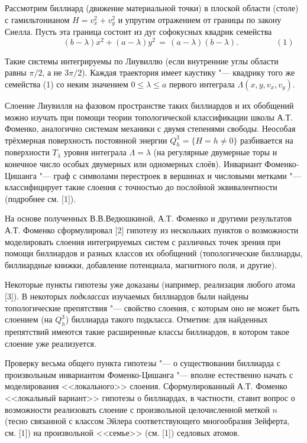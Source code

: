 \vzmscaption

Рассмотрим биллиард (движение материальной точки) в плоской области (столе) с гамильтонианом $H = v_x^2 + v_y^2$ и упругим отражением от границы по закону Снелла. Пусть эта граница состоит из дуг софокусных квадрик семейства
\[ \qquad \qquad \qquad (b - \lambda) x^2 + (a - \lambda) y^2 \, = \, (a - \lambda) (b - \lambda). \qquad\qquad \,\,\, (1)\]

Такие системы интегрируемы по Лиувиллю (если внутренние углы области равны $\pi\slash 2$, а не $3\pi\slash 2$). Каждая траектория имеет каустику "--- квадрику того же семейства (1) со неким значением $0 \le \lambda \le a$ первого интеграла $\Lambda(x, y, v_x, v_y)$.

Слоение Лиувилля на фазовом пространстве таких биллиардов и их обобщений можно изучать при помощи теории топологической классификации школы А.Т. Фоменко, аналогично системам механики с двумя степенями свободы. Неособая трёхмерная поверхность постоянной энергии $Q^3_h = \{H = h \ne 0\}$ разбивается на поверхности $T_\lambda$ уровня интеграла $\Lambda = \lambda$ (на регулярные двумерные торы и конечное число особых двумерных или одномерных слоёв). Инвариант Фоменко\--Цишанга "--- граф с символами перестроек в вершинах и числовыми метками "--- классифицирует такие слоения с точностью до послойной эквивалентности (подробнее см. [1]).

На основе полученных В.В.Ведюшкиной, А.Т. Фоменко и другими результатов А.Т. Фоменко сформулировал [2] гипотезу из нескольких пунктов о возможности моделировать слоения интегрируемых систем с различных точек зрения при помощи биллиардов и разных классов их обобщений (топологические биллиарды, биллиардные книжки, добавление потенциала, магнитного поля, и другие).

Некоторые пункты гипотезы уже доказаны (например, реализация любого атома [3]). В некоторых \textit{подклассах} изучаемых биллиардов были найдены топологические препятствия "--- свойство слоения, с которым оно не может быть слоением (на $Q^3_h$) биллиарда такого подкласса. Отметим: для найденных препятствий имеются такие расширенные классы биллиардов, в котором такое слоение уже реализуется.

Проверку весьма общего пункта гипотезы "--- о существовании биллиарда с произвольным инвариантом Фоменко\--Цишанга "--- вполне естественно начать с моделирования <<локального>> слоения. Сформулированный А.Т. Фоменко <<локальный вариант>> гипотезы о биллиардах, в частности, ставит вопрос о возможности реализовать слоение с произвольной целочисленной меткой $n$ (тесно связанной с классом Эйлера соответствующего многообразия Зейферта, см. [1]) на произвольной <<семье>> (см. [1]) седловых атомов.

